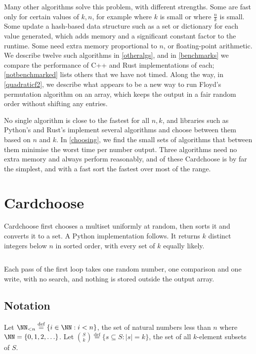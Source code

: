 \documentclass[letterpaper,11pt]{article}
\newcommand*{\defeq}{\stackrel{\text{def}}{=}}
\begin{document}
Many other algorithms solve this problem, with different strengths.
Some are fast only for certain values of \(k, n\), for example where
\(k\) is small or where \(\frac{n}{k}\) is small. Some update a
hash-based data structure such as a set or dictionary for each value
generated, which adds memory and a significant constant factor to the
runtime. Some need extra memory proportional to \(n\), or
floating-point arithmetic. We describe twelve such algorithms in
\autoref{otheralgs}, and in \autoref{benchmarks} we compare the
performance of C++ and Rust implementations of each;
\autoref{notbenchmarked} lists others that we have not timed. Along the way, in
\autoref{quadraticf2}, we describe what appears to be a new way to run
Floyd's permutation algorithm on an array, which keeps the output in a
fair random order without shifting any entries.

No single algorithm is close to the fastest for all \(n, k\), and
libraries such as Python's and Rust's implement several algorithms and
choose between them based on \(n\) and \(k\). In \autoref{choosing},
we find the small sets of algorithms that between them minimise the
worst time per number output. Three algorithms need no extra memory
and always perform reasonably, and of these Cardchoose is by far the
simplest, and with a fast sort the fastest over most of the range.

\section{Cardchoose}\label{cardchoose}

Cardchoose first chooses a multiset uniformly at random, then sorts it
and converts it to a set. A Python implementation follows. It returns
\(k\) distinct integers below \(n\) in sorted order, with every set of
\(k\) equally likely.

\inputminted{Python}{code/cardchoose.py}

Each pass of the first loop takes one random number, one comparison
and one write, with no search, and nothing is stored outside the output
array.

\subsection{Notation}

Let \(\NN_{<n} \defeq \{i \in \NN: i < n\}\), the set of natural
numbers less than \(n\) where \(\NN = \{0, 1, 2, \ldots\}\). Let
\(\binom{S}{k} \defeq \{s \subseteq S: |s| = k\}\), the set of all
\(k\)-element subsets of \(S\).
\end{document}
